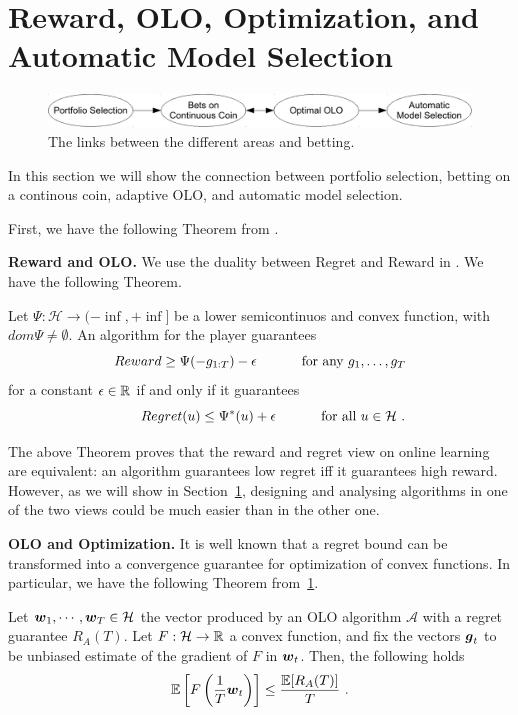 \section{Reward, OLO, Optimization, and Automatic Model Selection}

\begin{figure}[t]
\centering
\includegraphics[width=.95\linewidth]{./figs/links_between_areas.pdf}
\caption{The links between the different areas and betting.}
\end{figure}

In this section we will show the connection between portfolio selection, betting on a continous coin, adaptive OLO, and automatic model selection.

First, we have the following Theorem from \cite{}.

\textbf{Reward and OLO.}
We use the duality between Regret and Reward in \cite{McMahanO14}.
We have the following Theorem.
\begin{theorem}
  \label{thm:rrdual}
  Let $\Psi:\mathcal{H} \rightarrow (-\inf, +\inf]$ be a lower semicontinuos and convex function, with $dom \Psi \neq \emptyset$. An
  algorithm for the player guarantees
  \[
  Reward \geq \Psi(-g_{1:T}) - \epsilon \quad \quad \quad \textnormal{ for any } g_1, \dots, g_T
  \]
  for a constant $\epsilon \in \mathbb{R}$ if and only if it
  guarantees
  \begin{equation}\label{eq:regb}
  \qquad Regret(u) \leq \Psi^*(u) + \epsilon \quad \quad \quad \textnormal{ for all } u \in \mathcal{H}~.
  \end{equation}
\end{theorem}

The above Theorem proves that the reward and regret view on online learning are equivalent: an algorithm guarantees low regret iff it guarantees high reward.
However, as we will show in Section~\ref{}, designing and analysing algorithms in one of the two views could be much easier than in the other one.

\textbf{OLO and Optimization.}
It is well known that a regret bound can be transformed into a convergence guarantee for optimization of convex functions.
In particular, we have the following Theorem from~\ref{}.

\begin{theorem}
Let $\boldsymbol{w}_1, \cdots, \boldsymbol{w}_T \in \mathcal{H}$ the vector produced by an OLO algorithm $\mathcal{A}$ with a regret guarantee $R_A(T)$.
Let $F:\mathcal{H}\rightarrow\mathbb{R}$ a convex function, and fix the vectors $\boldsymbol{g}_t$ to be unbiased estimate of the gradient of $F$ in $\boldsymbol{w}_t$. Then, the following holds
\[
\mathbb{E}\left[F\left(\frac{1}{T} \boldsymbol{w}_t\right)\right] \leq \frac{\mathbb{E}[R_A(T)]}{T}~.
\]
\end{theorem}

